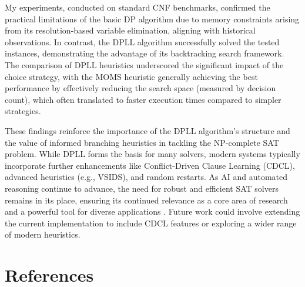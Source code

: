 \documentclass[12pt, a4paper]{article}
\begin{document}
My experiments, conducted on standard CNF benchmarks, confirmed the practical limitations of the basic DP algorithm due to memory constraints arising from its resolution-based variable elimination, aligning with historical observations. In contrast, the DPLL algorithm successfully solved the tested instances, demonstrating the advantage of its backtracking search framework. The comparison of DPLL heuristics underscored the significant impact of the choice strategy, with the MOMS heuristic generally achieving the best performance by effectively reducing the search space (measured by decision count), which often translated to faster execution times compared to simpler strategies.

These findings reinforce the importance of the DPLL algorithm's structure and the value of informed branching heuristics in tackling the NP-complete SAT problem. While DPLL forms the basis for many solvers, modern systems typically incorporate further enhancements like Conflict-Driven Clause Learning (CDCL), advanced heuristics (e.g., VSIDS), and random restarts. As AI and automated reasoning continue to advance, the need for robust and efficient SAT solvers remains in its place, ensuring its continued relevance as a core area of research and a powerful tool for diverse applications \cite{Autoblocks}. Future work could involve extending the current implementation to include CDCL features or exploring a wider range of modern heuristics.

\section*{References}
\label{sec:references}
\end{document}
